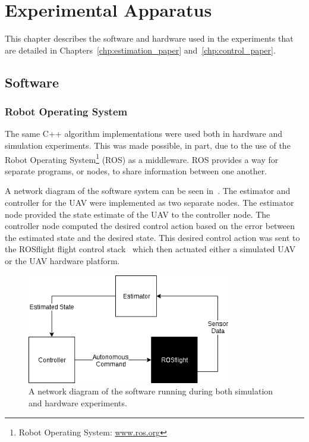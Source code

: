 
\chapter{Experimental Apparatus}
\label{chp:experimental_apparatus}

This chapter describes the software and hardware used in the experiments that
are detailed in Chapters~\ref{chp:estimation_paper} and~\ref{chp:control_paper}.

\section{Software}
\subsection {Robot Operating System}
The same C++ algorithm implementations were used both in hardware and simulation
experiments.
This was made possible, in part, due to the use of the Robot Operating System\footnote{Robot Operating System:
\href{www.ros.org}{www.ros.org}} (ROS) as a middleware. ROS provides a way for separate
programs, or nodes, to share information between one another.

A network diagram of the software system can be seen in~. The estimator and
controller for the UAV were implemented as two separate nodes. 
The estimator node provided the state estimate of the UAV to the controller node.
The controller node computed the desired control action based on the error
between the estimated state and the desired state. This desired control action
was sent to the ROSflight flight control stack~\cite{jackson2016rosflight}
which then actuated either a simulated UAV or the UAV hardware platform.

\begin{figure}[htbp]
  \centering
  \includegraphics[width=3.5in]{figures/roscopter.png}
  \caption[Software Architecture Network Diagram]{A network diagram of the
  software running during both simulation and hardware experiments.}
%
  \label{fig:network_diagram}
\end{figure}

